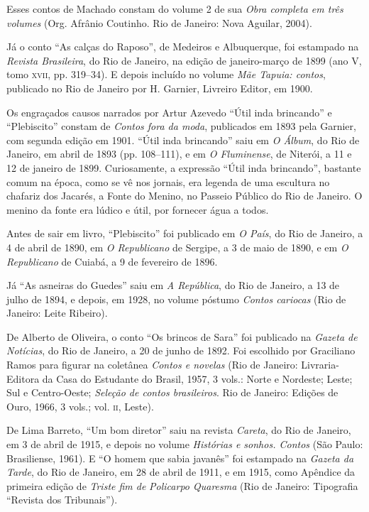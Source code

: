 Esses contos de Machado constam do volume 2 de sua \emph{Obra completa
em três volumes} (Org. Afrânio Coutinho. Rio de Janeiro: Nova Aguilar,
2004).

Já o conto ``As calças do Raposo'', de Medeiros e Albuquerque, foi
estampado na \emph{Revista Brasileira}, do Rio de Janeiro, na edição de
janeiro-março de 1899 (ano V, tomo \textsc{xvii}, pp. 319--34). E depois incluído
no volume \emph{Mãe Tapuia: contos}, publicado no Rio de Janeiro por H.
Garnier, Livreiro Editor, em 1900.

Os engraçados causos narrados por Artur Azevedo ``Útil inda brincando''
e ``Plebiscito'' constam de \emph{Contos fora da moda}, publicados em
1893 pela Garnier, com segunda edição em 1901. ``Útil inda brincando''
saiu em \emph{O Álbum}, do Rio de Janeiro, em abril de 1893 (pp.
108--111), e em \emph{O Fluminense}, de Niterói, a 11 e 12 de janeiro de
1899. Curiosamente, a expressão ``Útil inda brincando'', bastante comum
na época, como se vê nos jornais, era legenda de uma escultura no
chafariz dos Jacarés, a Fonte do Menino, no Passeio Público do Rio de
Janeiro. O menino da fonte era lúdico e útil, por fornecer água a todos.

Antes de sair em livro, ``Plebiscito'' foi publicado em \emph{O País},
do Rio de Janeiro, a 4 de abril de 1890, em \emph{O Republicano} de
Sergipe, a 3 de maio de 1890, e em \emph{O Republicano} de Cuiabá, a 9
de fevereiro de 1896.

Já ``As asneiras do Guedes'' saiu em \emph{A República}, do Rio de
Janeiro, a 13 de julho de 1894, e depois, em 1928, no volume póstumo
\emph{Contos cariocas} (Rio de Janeiro: Leite Ribeiro).

De Alberto de Oliveira, o conto ``Os brincos de Sara'' foi publicado na
\emph{Gazeta de Notícias}, do Rio de Janeiro, a 20 de junho de 1892. Foi
escolhido por Graciliano Ramos para figurar na coletânea \emph{Contos e
novelas} (Rio de Janeiro: Livraria-Editora da Casa do Estudante do
Brasil, 1957, 3 vols.: Norte e Nordeste; Leste; Sul e Centro-Oeste;
\emph{Seleção de contos brasileiros}. Rio de Janeiro: Edições de Ouro,
1966, 3 vols.; vol. \textsc{ii}, Leste).

De Lima Barreto, ``Um bom diretor'' saiu na revista \emph{Careta}, do
Rio de Janeiro, em 3 de abril de 1915, e depois no volume
\emph{Histórias e sonhos. Contos} (São Paulo: Brasiliense, 1961). E ``O
homem que sabia javanês'' foi estampado na \emph{Gazeta da Tarde}, do
Rio de Janeiro, em 28 de abril de 1911, e em 1915, como Apêndice da
primeira edição de \emph{Triste fim de} \emph{Policarpo Quaresma} (Rio
de Janeiro: Tipografia ``Revista dos Tribunais'').

